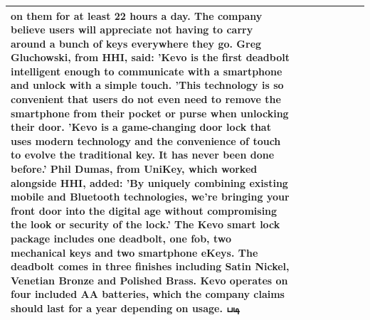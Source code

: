 \begin{table}[H]
\begin{tabular}{llrlllll}
on them for at least 22 hours a day. The company believe users will appreciate not having to carry around a bunch of keys everywhere they go. Greg Gluchowski, from HHI, said: 'Kevo is the first deadbolt intelligent enough to communicate with a smartphone and unlock with a simple touch. 'This technology is so convenient that users do not even need to remove the smartphone from their pocket or purse when unlocking their door. 'Kevo is a game-changing door lock that uses modern technology and the convenience of touch to evolve the traditional key. It has never been done before.' Phil Dumas, from UniKey, which worked alongside HHI, added: 'By uniquely combining existing mobile and Bluetooth technologies, we’re bringing your front door into the digital age without compromising the look or security of the lock.' The Kevo smart lock package includes one deadbolt, one fob, two mechanical keys and two smartphone eKeys. The deadbolt comes in three finishes including Satin Nickel, Venetian Bronze and Polished Brass. Kevo operates on four included AA batteries, which the company claims should last for a year depending on usage. படி \\
\bottomrule
\end{tabular}
\end{table}
